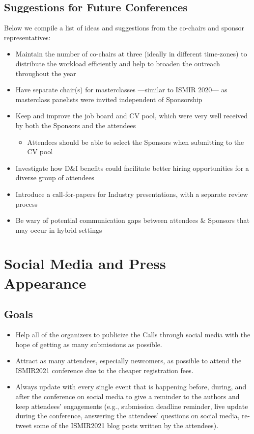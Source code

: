 \documentclass[%
10pt,								%
]
{scrartcl}
\begin{document}
    \subsection{Suggestions for Future Conferences}
        Below we compile a list of ideas and suggestions from the co-chairs and sponsor representatives:
        \begin{itemize}
            \item   Maintain the number of co-chairs at three (ideally in different time-zones) to distribute the workload efficiently and help to broaden the outreach throughout the year 
            \item   Have separate chair(s) for masterclasses ---similar to ISMIR 2020--- as masterclass panelists were invited independent of Sponsorship
            \item   Keep and improve the job board and CV pool, which were very well received by both the Sponsors and the attendees
            \begin{itemize}
                \item Attendees should be able to select the Sponsors when submitting to the CV pool
            \end{itemize}
            \item   Investigate how D\&I benefits could facilitate better hiring opportunities for a diverse group of attendees
            \item   Introduce a call-for-papers for Industry presentations, with a separate review process 
            \item   Be wary of potential communication gaps between attendees \& Sponsors that may occur in hybrid settings
        \end{itemize}


\section{Social Media and Press Appearance}
    \subsection{Goals}
        \begin{itemize}
            \item   Help all of the organizers to publicize the Calls through social media with the hope of getting as many submissions as possible.
            \item   Attract as many attendees, especially newcomers, as possible to attend the ISMIR2021 conference due to the cheaper registration fees.
            \item   Always update with every single event that is happening before, during, and after the conference on social media to give a reminder to the authors and keep attendees’ engagements (e.g., submission deadline reminder, live update during the conference, answering the attendees' questions on social media, re-tweet some of the ISMIR2021 blog posts written by the attendees).
        \end{itemize}
        
\end{document}

